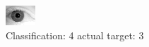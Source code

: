 \begin{figure}[h!]
\begin{center}
\includegraphics[width=0.60\columnwidth]{figures/ID2109_class_4_target_3.png}
\end{center}
\caption{ Classification: 4 actual target: 3}
\label{fig:ID2109_class_4_target_3}
\end{figure}
